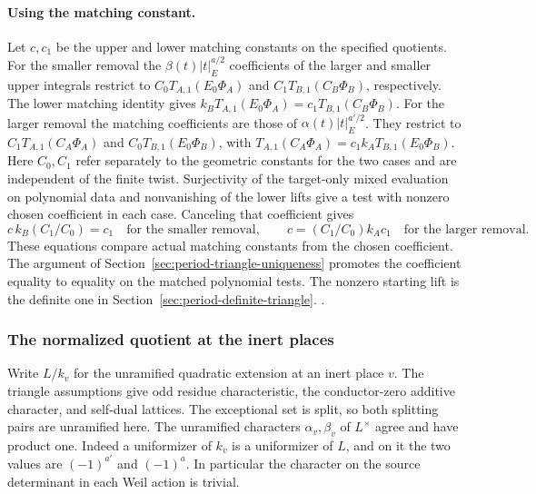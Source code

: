 \paragraph{Using the matching constant.}
Let \(c,c_1\) be the upper and lower matching constants on the
specified quotients. For the smaller removal the
\(\beta(t)|t|_E^{a/2}\) coefficients of the larger and smaller upper
integrals restrict to \(C_0 T_{A,1}(E_0\Phi_A)\) and
\(C_1 T_{B,1}(C_B\Phi_B)\), respectively. The lower matching
identity gives \(k_B T_{A,1}(E_0\Phi_A)=c_1 T_{B,1}(C_B\Phi_B)\).
For the larger removal the matching coefficients are those of
\(\alpha(t)|t|_E^{a'/2}\). They restrict to
\(C_1 T_{A,1}(C_A\Phi_A)\) and \(C_0 T_{B,1}(E_0\Phi_B)\),
with \(T_{A,1}(C_A\Phi_A)=c_1 k_A T_{B,1}(E_0\Phi_B)\).
Here \(C_0,C_1\) refer separately to the geometric constants for the
two cases and are independent of the finite twist. Surjectivity of
the target-only mixed evaluation on polynomial data and nonvanishing
of the lower lifts give a test with nonzero chosen coefficient in
each case. Canceling that coefficient gives
\[
 c\, k_B (C_1/C_0)=c_1\quad\text{for the smaller removal},\qquad
 c=(C_1/C_0) k_A c_1\quad\text{for the larger removal}.
\]
These equations compare actual matching constants from the
chosen coefficient. The argument of
Section~\ref{sec:period-triangle-uniqueness} promotes the
coefficient equality to equality on the matched polynomial
tests. The nonzero starting lift is the definite one in
Section~\ref{sec:period-definite-triangle}.
.

\subsubsection{The normalized quotient at the inert places}
Write \(L/k_v\) for the unramified quadratic extension
at an inert place \(v\). The triangle assumptions give odd
residue characteristic, the conductor-zero additive
character, and self-dual lattices. The exceptional set
is split, so both splitting pairs are unramified here.
The unramified characters \(\alpha_v,\beta_v\) of
\(L^\times\) agree and have product one. Indeed a
uniformizer of \(k_v\) is a uniformizer of \(L\), and on
it the two values are \((-1)^{a'}\) and \((-1)^a\).
In particular the character on the source determinant
in each Weil action is trivial.

